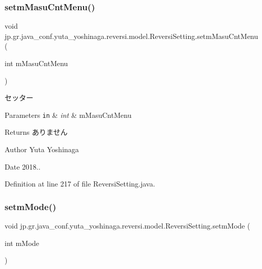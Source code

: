 \subsubsection{\texorpdfstring{setm\+Masu\+Cnt\+Menu()}{setmMasuCntMenu()}}
{\footnotesize\ttfamily void jp.\+gr.\+java\+\_\+conf.\+yuta\+\_\+yoshinaga.\+reversi.\+model.\+Reversi\+Setting.\+setm\+Masu\+Cnt\+Menu (\begin{DoxyParamCaption}\item[{int}]{m\+Masu\+Cnt\+Menu }\end{DoxyParamCaption})}



セッター 


\begin{DoxyParams}[1]{Parameters}
\mbox{\tt in}  & {\em int} & m\+Masu\+Cnt\+Menu \\
\hline
\end{DoxyParams}
\begin{DoxyReturn}{Returns}
ありません 
\end{DoxyReturn}
\begin{DoxyAuthor}{Author}
Yuta Yoshinaga 
\end{DoxyAuthor}
\begin{DoxyDate}{Date}
2018.. 
\end{DoxyDate}


Definition at line 217 of file Reversi\+Setting.\+java.

\mbox{\label{classjp_1_1gr_1_1java__conf_1_1yuta__yoshinaga_1_1reversi_1_1model_1_1_reversi_setting_a2838366ac19c8b092acbc498edbc06c4}} 
\subsubsection{\texorpdfstring{setm\+Mode()}{setmMode()}}
{\footnotesize\ttfamily void jp.\+gr.\+java\+\_\+conf.\+yuta\+\_\+yoshinaga.\+reversi.\+model.\+Reversi\+Setting.\+setm\+Mode (\begin{DoxyParamCaption}\item[{int}]{m\+Mode }\end{DoxyParamCaption})}



